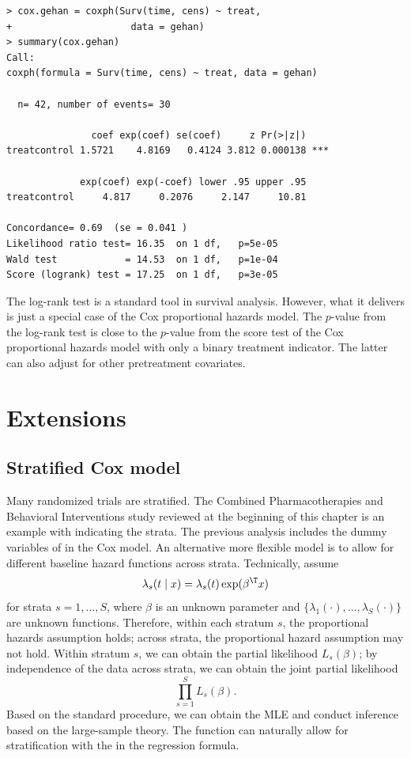 \begin{lstlisting}
> cox.gehan = coxph(Surv(time, cens) ~ treat,
+                     data = gehan)
> summary(cox.gehan)
Call:
coxph(formula = Surv(time, cens) ~ treat, data = gehan)

  n= 42, number of events= 30 

               coef exp(coef) se(coef)     z Pr(>|z|)    
treatcontrol 1.5721    4.8169   0.4124 3.812 0.000138 ***

             exp(coef) exp(-coef) lower .95 upper .95
treatcontrol     4.817     0.2076     2.147     10.81

Concordance= 0.69  (se = 0.041 )
Likelihood ratio test= 16.35  on 1 df,   p=5e-05
Wald test            = 14.53  on 1 df,   p=1e-04
Score (logrank) test = 17.25  on 1 df,   p=3e-05
\end{lstlisting}


The log-rank test is a standard tool in survival analysis. However, what it delivers is just a special case of the Cox proportional hazards model. The $p$-value from the log-rank test is close to the $p$-value from the score test of the Cox proportional hazards model with only a binary treatment indicator. The latter can also adjust for other pretreatment covariates. 

 
 
\section{Extensions}


\subsection{Stratified Cox model}

Many randomized trials are stratified. The Combined Pharmacotherapies and Behavioral Interventions study reviewed at the beginning of this chapter is an example with  indicating the strata. The previous analysis includes the dummy variables of   in the Cox model. An alternative more flexible model is to allow for different baseline hazard functions across strata. Technically, assume
$$
\lambda_s(t \mid x) = \lambda_s(t) \exp(\beta^{\T} x)
$$
for strata $s = 1,\ldots, S$, where $\beta$ is an unknown parameter and $\{ \lambda_1(\cdot), \ldots, \lambda_S(\cdot) \}$ are unknown functions. Therefore, within each stratum $s$, the proportional hazards assumption holds; across strata, the proportional hazard assumption may not hold. Within stratum $s$, we can obtain the partial likelihood $L_s(\beta)$; by independence of the data across strata, we can obtain the joint partial likelihood 
$$
\prod_{s=1}^S L_s(\beta) .
$$
Based on the standard procedure, we can obtain the MLE and conduct inference based on the large-sample theory. The  function can naturally allow for stratification with the  in the regression formula.

